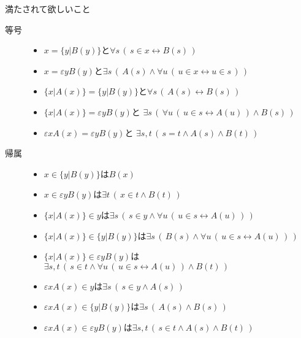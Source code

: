 	\begin{itembox}[l]{満たされて欲しいこと}
		\begin{description}
			\item[等号]
				\begin{itemize}
					\item $x = \{y|B(y)\}$と$\forall s\, \left(\, s \in x \leftrightarrow B(s)\, \right)$
					\item $x = \varepsilon y B(y)$と$\exists s\, \left(\, A(s) \wedge \forall u\,
						\left(\, u \in x \leftrightarrow u \in s\, \right)\, \right)$
					\item $\{x|A(x)\} = \{y|B(y)\}$と$\forall s\, \left(\, A(s) \leftrightarrow B(s)\, \right)$
					\item $\{x|A(x)\} = \varepsilon y B(y)$と
						$\exists s\, \left(\, \forall u\,
						\left(\, u \in s \leftrightarrow A(u)\, \right) \wedge B(s)\, \right)$
					\item $\varepsilon x A(x) = \varepsilon y B(y)$と
						$\exists s,t\, \left(\, s = t \wedge A(s) \wedge B(t)\, \right)$
				\end{itemize}
				
			\item[帰属]
				\begin{itemize}
					\item $x \in \{y|B(y)\}$は$B(x)$
					\item $x \in \varepsilon y B(y)$は$\exists t\, \left(\, x \in t \wedge B(t)\, \right)$
					\item $\{x|A(x)\} \in y$は$\exists s\, \left(\, s \in y \wedge \forall u\, \left(\, u \in s \leftrightarrow A(u)\, \right)\, \right)$
					\item $\{x|A(x)\} \in \{y|B(y)\}$は$\exists s\, \left(\, B(s) \wedge \forall u\, \left(\, u \in s \leftrightarrow A(u)\, \right)\, \right)$
					\item $\{x|A(x)\} \in \varepsilon y B(y)$は$\exists s,t\, \left(\, s \in t \wedge \forall u\, \left(\, u \in s \leftrightarrow A(u)\, \right) \wedge B(t)\, \right)$
					\item $\varepsilon x A(x) \in y$は$\exists s\, \left(\, s \in y \wedge A(s)\, \right)$
					\item $\varepsilon x A(x) \in \{y|B(y)\}$は$\exists s\, \left(\, A(s) \wedge B(s)\, \right)$
					\item $\varepsilon x A(x) \in \varepsilon y B(y)$は$\exists s,t\, \left(\, s \in t \wedge A(s) \wedge B(t)\, \right)$
				\end{itemize}
		\end{description}
	\end{itembox}

